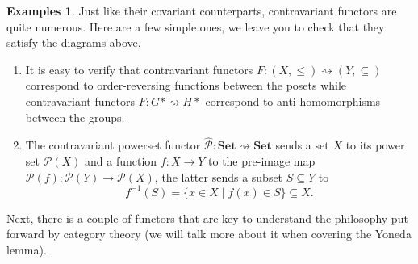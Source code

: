 \documentclass{article}
\theoremstyle{definition}
\newtheorem{exmps}[thm]{Examples}
\theoremstyle{remark}
\newcommand{\mP}{\mathcal{P}}
\begin{document}
\begin{exmps}
	Just like their covariant counterparts, contravariant functors are quite numerous. Here are a few simple ones, we leave you to check that they satisfy the diagrams above.
	\begin{enumerate}
		\item It is easy to verify that contravariant functors $F: (X, \leq) \rightsquigarrow (Y, \subseteq)$ correspond to order-reversing functions between the posets while contravariant functors $F: G\ast \rightsquigarrow H\ast$ correspond to anti-homomorphisms between the groups.
		\item The contravariant powerset functor $\widehat{\mP}: \textbf{Set} \rightsquigarrow \textbf{Set}$ sends a set $X$ to its power set $\mP(X)$ and a function $f: X\rightarrow Y$ to the pre-image map $\mP(f):\mP(Y)\rightarrow \mP(X)$, the latter sends a subset $S\subseteq Y$ to \[f^{-1}(S) = \{x \in X \mid f(x) \in S\} \subseteq X.\]
	\end{enumerate}
\end{exmps}
Next, there is a couple of functors that are key to understand the philosophy put forward by category theory (we will talk more about it when covering the Yoneda lemma).
\end{document}
